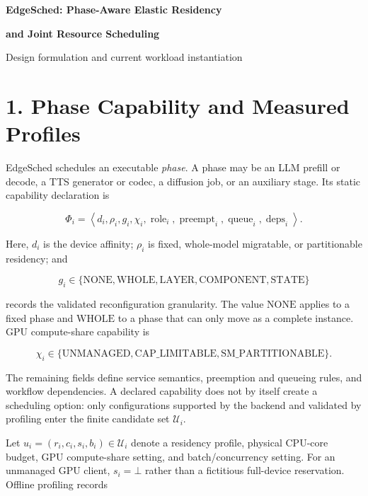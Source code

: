 \documentclass[10pt]{article}
\begin{document}
\begin{center}
{\LARGE\bfseries EdgeSched: Phase-Aware Elastic Residency\par}
\vspace{2pt}
{\Large\bfseries and Joint Resource Scheduling\par}
\vspace{5pt}
{\small Design formulation and current workload instantiation}
\end{center}

\section*{1. Phase Capability and Measured Profiles}

EdgeSched schedules an executable \emph{phase}.  A phase may be an LLM prefill
or decode, a TTS generator or codec, a diffusion job, or an auxiliary stage.
Its static capability declaration is

\begin{equation}
\Phi_i = \left\langle
    d_i,\rho_i,g_i,\chi_i,
    \operatorname{role}_i,
    \operatorname{preempt}_i,
    \operatorname{queue}_i,
    \operatorname{deps}_i
\right\rangle .
\end{equation}

Here, $d_i$ is the device affinity; $\rho_i$ is fixed, whole-model migratable,
or partitionable residency; and

\begin{equation}
g_i\in\{\mathrm{NONE},\mathrm{WHOLE},\mathrm{LAYER},
             \mathrm{COMPONENT},\mathrm{STATE}\}
\end{equation}

records the validated reconfiguration granularity.  The value $\mathrm{NONE}$
applies to a fixed phase and $\mathrm{WHOLE}$ to a phase that can only move as a
complete instance.  GPU compute-share capability is

\begin{equation}
\chi_i\in\{\mathrm{UNMANAGED},\mathrm{CAP\_LIMITABLE},
                 \mathrm{SM\_PARTITIONABLE}\}.
\end{equation}

The remaining fields define service semantics, preemption and queueing rules,
and workflow dependencies.  A declared capability does not by itself create a
scheduling option: only configurations supported by the backend and validated
by profiling enter the finite candidate set $\mathcal U_i$.

Let $u_i=(r_i,c_i,s_i,b_i)\in\mathcal U_i$ denote a residency profile, physical
CPU-core budget, GPU compute-share setting, and batch/concurrency setting.  For
an unmanaged GPU client, $s_i=\bot$ rather than a fictitious full-device
reservation.  Offline profiling records
\end{document}
